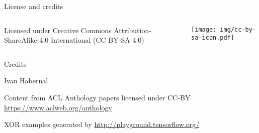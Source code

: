 \documentclass[12pt,aspectratio=169,handout]{beamer}
\begin{document}
\begin{frame}{License and credits}

	\begin{columns}
		\begin{column}{0.7\textwidth}
			Licensed under Creative Commons Attribution-ShareAlike 4.0 International (CC BY-SA 4.0)
		\end{column}
		\begin{column}{0.2\textwidth}
			\texttt{[image: img/cc-by-sa-icon.pdf]}
		\end{column}
	\end{columns}
	
	\bigskip
	
	Credits
	
	\begin{scriptsize}
		
		Ivan Habernal
		
		Content from ACL Anthology papers licensed under CC-BY \url{https://www.aclweb.org/anthology}
		
		XOR examples generated by \url{http://playground.tensorflow.org/}
		
	\end{scriptsize}
	
\end{frame}
\end{document}
